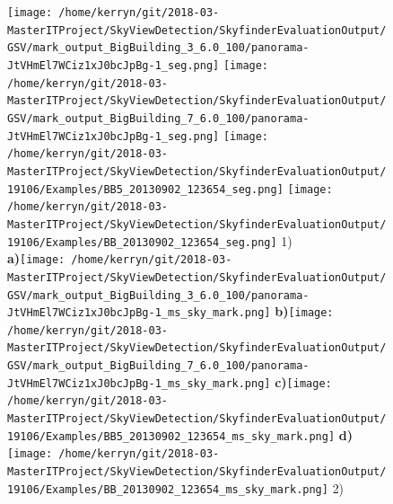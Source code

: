 \documentclass{article}
\begin{document}
\clearpage %
\begin{figure}
\centering    
\textbf{}\texttt{[image: /home/kerryn/git/2018-03-MasterITProject/SkyViewDetection/SkyfinderEvaluationOutput/GSV/mark\_output\_BigBuilding\_3\_6.0\_100/panorama-JtVHmEl7WCiz1xJ0bcJpBg-1\_seg.png]} 
\textbf{}\texttt{[image: /home/kerryn/git/2018-03-MasterITProject/SkyViewDetection/SkyfinderEvaluationOutput/GSV/mark\_output\_BigBuilding\_7\_6.0\_100/panorama-JtVHmEl7WCiz1xJ0bcJpBg-1\_seg.png]} 
\textbf{}\texttt{[image: /home/kerryn/git/2018-03-MasterITProject/SkyViewDetection/SkyfinderEvaluationOutput/19106/Examples/BB5\_20130902\_123654\_seg.png]} 
\textbf{}\texttt{[image: /home/kerryn/git/2018-03-MasterITProject/SkyViewDetection/SkyfinderEvaluationOutput/19106/Examples/BB\_20130902\_123654\_seg.png]} \scriptsize{1)}
\\
\textbf{\scriptsize{a)}}\texttt{[image: /home/kerryn/git/2018-03-MasterITProject/SkyViewDetection/SkyfinderEvaluationOutput/GSV/mark\_output\_BigBuilding\_3\_6.0\_100/panorama-JtVHmEl7WCiz1xJ0bcJpBg-1\_ms\_sky\_mark.png]} 
\textbf{\scriptsize{b)}}\texttt{[image: /home/kerryn/git/2018-03-MasterITProject/SkyViewDetection/SkyfinderEvaluationOutput/GSV/mark\_output\_BigBuilding\_7\_6.0\_100/panorama-JtVHmEl7WCiz1xJ0bcJpBg-1\_ms\_sky\_mark.png]} 
\textbf{\scriptsize{c)}}\texttt{[image: /home/kerryn/git/2018-03-MasterITProject/SkyViewDetection/SkyfinderEvaluationOutput/19106/Examples/BB5\_20130902\_123654\_ms\_sky\_mark.png]} 
\textbf{\scriptsize{d)}}\texttt{[image: /home/kerryn/git/2018-03-MasterITProject/SkyViewDetection/SkyfinderEvaluationOutput/19106/Examples/BB\_20130902\_123654\_ms\_sky\_mark.png]} \scriptsize{2)}
\end{figure} 
\end{document}
